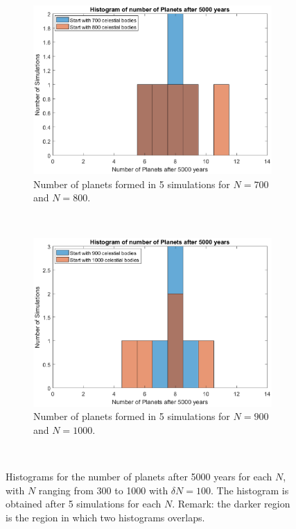 \begin{figure}[H]
	\begin{subfigure}{0.45\textwidth}
	\includegraphics[width=\textwidth]{AP700800.eps}
	\caption{Number of planets formed in 5 simulations for $N=700$ and $N=800$.}
	\end{subfigure}
	~
	\begin{subfigure}{0.45\textwidth}
	\includegraphics[width=\textwidth]{AP9001000.eps}
	\caption{Number of planets formed in 5 simulations for $N=900$ and $N=1000$.}
	\end{subfigure}
	~
	\caption{Histograms for the number of planets after 5000 years for each $N$, with $N$ ranging from 300 to 1000 with $\delta N=100$. The histogram is obtained after 5 simulations for each $N$. Remark: the darker region is the region in which two histograms overlaps.}
	\label{Histograms}
\end{figure}
